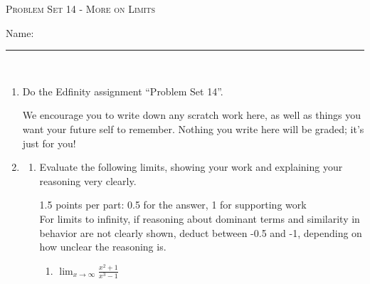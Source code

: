 \documentclass{article}
\newcommand{\doedfinity}[2][\newpage]{
  \begin{problem}[#1]
    Do the Edfinity assignment ``Problem Set #2''.

    We encourage you to write down any scratch work here, as well as
    things you want your future self to remember. Nothing you write
    here will be graded; it's just for you!
  \end{problem}
}
\begin{document}
\begin{center}
  \large\textsc{Problem Set 14 - More on Limits}\vspace{.5in}\\
  \begin{problemonly}
   \large Name: \rule{5cm}{0.15mm}\\
   \end{problemonly}
\end{center}

\begin{enumerate}
\item  {}

  \doedfinity{14}

\item \label{limits-choose-graph-1}

  \begin{enumerate}
  \item \label{limits-choose-graph-1-evaluate}

    Evaluate the following limits, showing your work and explaining your reasoning very clearly.

    \begin{grading}
      1.5 points per part: 0.5 for the answer, 1 for supporting work\\
      For limits to infinity, if reasoning about dominant terms and similarity in behavior are not clearly shown, deduct between -0.5 and -1, depending on how unclear the reasoning is.
    \end{grading}

    \begin{enumerate} 
    \item
      \begin{problem}[\vfill]
        $\displaystyle \lim_{x \to \infty} \frac{x^2 + 1}{x^3 - 1}$
      \end{problem}


\end{enumerate}
\end{enumerate}
\end{enumerate}
\end{document}
